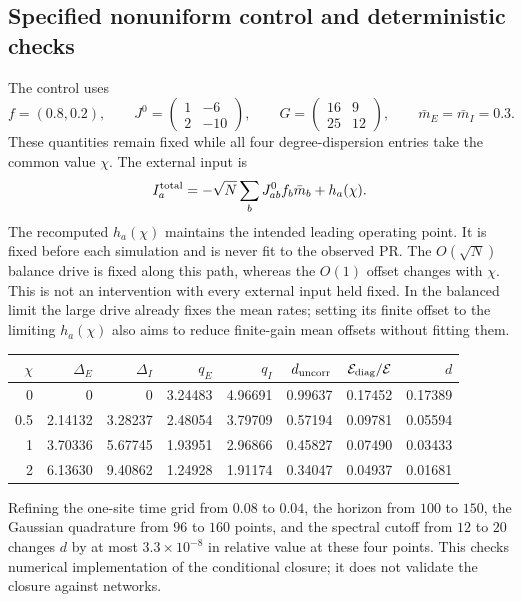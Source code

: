 \subsection{Specified nonuniform control and deterministic checks}

The control uses
\[
 f=(0.8,0.2),\qquad
 J^0=\begin{pmatrix}1&-6\\2&-10\end{pmatrix},\qquad
 G=\begin{pmatrix}16&9\\25&12\end{pmatrix},\qquad
 \bar m_E=\bar m_I=0.3.
\]
These quantities remain fixed while all four degree-dispersion entries take
the common value \(\chi\). The external input is
\[
 I_a^{\rm total}=
 -\sqrt N\sum_bJ^0_{ab}f_b\bar m_b+h_a(\chi).
\]
The recomputed \(h_a(\chi)\) maintains the intended leading operating point.
It is fixed before each simulation and is never fit to the observed PR.
The \(O(\sqrt N)\) balance drive is fixed along this path, whereas the
\(O(1)\) offset changes with \(\chi\). This is not an intervention with every
external input held fixed. In the balanced limit the large drive already
fixes the mean rates; setting its finite offset to the limiting \(h_a(\chi)\)
also aims to reduce finite-gain mean offsets without fitting them.

\begin{center}
\begin{tabular}{r|rr|rr|rrr}
\(\chi\)&\(\Delta_E\)&\(\Delta_I\)&\(q_E\)&\(q_I\)&
\(d_{\rm uncorr}\)&\(\mathcal E_{\rm diag}/\mathcal E\)&\(d\)\\
\hline
0&0&0&3.24483&4.96691&0.99637&0.17452&0.17389\\
0.5&2.14132&3.28237&2.48054&3.79709&0.57194&0.09781&0.05594\\
1&3.70336&5.67745&1.93951&2.96866&0.45827&0.07490&0.03433\\
2&6.13630&9.40862&1.24928&1.91174&0.34047&0.04937&0.01681
\end{tabular}
\end{center}

Refining the one-site time grid from \(0.08\) to \(0.04\), the horizon from
\(100\) to \(150\), the Gaussian quadrature from \(96\) to \(160\) points, and
the spectral cutoff from \(12\) to \(20\) changes \(d\) by at most
\(3.3\times10^{-8}\) in relative value at these four points. This checks
numerical implementation of the conditional closure; it does not validate
the closure against networks.


